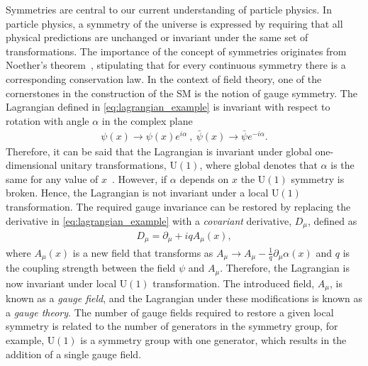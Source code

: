 Symmetries are central to our current understanding of particle physics. In particle physics, a symmetry of the universe is expressed by requiring that all physical predictions are unchanged or invariant under the same set of transformations. The importance of the concept of symmetries originates from Noether's theorem~\cite{Noether1918}, stipulating that for every continuous symmetry there is a corresponding conservation law. In the context of field theory, one of the cornerstones in the construction of the SM is the notion of gauge symmetry. The Lagrangian defined in \cref{eq:lagrangian_example} is invariant with respect to rotation with angle $\alpha$ in the complex plane 
\begin{equation}
    \label{eq:unitary}
    \begin{aligned}
        \psi(x) \rightarrow \psi(x)e^{i\alpha}~,~\bar{\psi}(x) \rightarrow \bar{\psi}e^{-i\alpha}.
    \end{aligned}
\end{equation}
Therefore, it can be said that the Lagrangian is invariant under global one-dimensional unitary transformations, $\mathrm{U(1)}$, where global denotes that $\alpha$ is the same for any value of $x$~\cite{stephanhaywood}. However, if $\alpha$ depends on $x$ the $\mathrm{U(1)}$ symmetry is broken. Hence, the Lagrangian is not invariant under a local $\mathrm{U(1)}$ transformation. The required gauge invariance can be restored by replacing the derivative in \cref{eq:lagrangian_example} with a \emph{covariant} derivative, $D_\mu$, defined as 
\begin{equation}
    \label{eq:covdir}
    \begin{aligned}
        D_\mu = \partial_\mu + iqA_\mu(x),
    \end{aligned}
\end{equation}
where $A_\mu(x)$ is a new field that transforms as $A_\mu \rightarrow A_\mu - \frac{1}{q}\partial_\mu\alpha(x)$ and $q$ is the coupling strength between the field $\psi$ and $A_\mu$. Therefore, the Lagrangian is now invariant under local $\mathrm{U(1)}$ transformation. The introduced field, $A_\mu$, is known as a \emph{gauge field}, and the Lagrangian under these modifications is known as a \emph{gauge theory}. The number of gauge fields required to restore a given local symmetry is related to the number of generators in the symmetry group, for example, $\mathrm{U(1)}$ is a symmetry group with one generator, which results in the addition of a single gauge field. 

